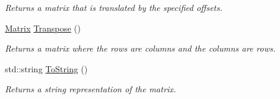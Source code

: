 \begin{DoxyCompactItemize}
\begin{DoxyCompactList}\small\item\em Returns a matrix that is translated by the specified offsets. \end{DoxyCompactList}\item 
\hypertarget{struct_jade_1_1_math_1_1_matrix_ac235e6add4163f779f1a3b007ee0f6d7}{}\hyperlink{struct_jade_1_1_math_1_1_matrix}{Matrix} \hyperlink{struct_jade_1_1_math_1_1_matrix_ac235e6add4163f779f1a3b007ee0f6d7}{Transpose} ()\label{struct_jade_1_1_math_1_1_matrix_ac235e6add4163f779f1a3b007ee0f6d7}

\begin{DoxyCompactList}\small\item\em Returns a matrix where the rows are columns and the columns are rows. \end{DoxyCompactList}\item 
\hypertarget{struct_jade_1_1_math_1_1_matrix_a913cad2a5906c10e1547ca26a1c3f18d}{}std\+::string \hyperlink{struct_jade_1_1_math_1_1_matrix_a913cad2a5906c10e1547ca26a1c3f18d}{To\+String} ()\label{struct_jade_1_1_math_1_1_matrix_a913cad2a5906c10e1547ca26a1c3f18d}

\begin{DoxyCompactList}\small\item\em Returns a string representation of the matrix. \end{DoxyCompactList}\end{DoxyCompactItemize}
